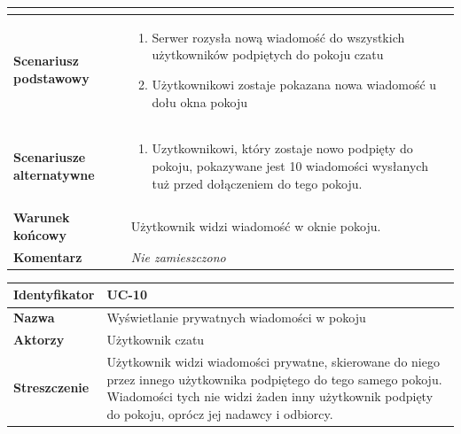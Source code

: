 \documentclass[11pt,oneside,a4paper,titlepage,onecolumn]{article}
\newenvironment{enumreq}
{ \begin{enumerate}[topsep=0pt,itemsep=-1ex,partopsep=1ex,parsep=1ex] }
{ \end{enumerate}                  }
\begin{document}
{\begin{tabular}{ | l | l | }
{		}
		\\

	\hline
		\parbox[t]{4cm}{\textbf{Scenariusz podstawowy}} & \parbox[t]{11cm}{
			\begin{enumreq}
				\item Serwer rozysła nową wiadomość do wszystkich
				użytkowników podpiętych do pokoju czatu
				\item Użytkownikowi zostaje pokazana nowa wiadomość
				u dołu okna pokoju
			\end{enumreq}
		}
		\\
		
	\hline
		\parbox[t]{4cm}{\textbf{Scenariusze alternatywne}} & \parbox[t]
		{11cm}{
			\begin{enumreq}
				\item Uzytkownikowi, który zostaje nowo podpięty do pokoju,
				pokazywane jest 10 wiadomości wysłanych tuż przed dołączeniem
				do tego pokoju.
			\end{enumreq}
		}
		\\
		
	\hline
		\parbox[t]{4cm}{\textbf{Warunek końcowy}} & \parbox[t]{11cm}{
			Użytkownik widzi wiadomość w oknie pokoju.
		}
		\\
		
	\hline
		\parbox[t]{4cm}{\textbf{Komentarz}} & \parbox[t]{11cm}{
			\textit{Nie zamieszczono}
		}
		\\

	\hline
\end{tabular}

\vspace{2em}

\begin{tabular}{ | l | l | }
	\hline
		\textbf{Identyfikator} & 
		UC-10
		\\
		
	\hline
		\textbf{Nazwa} & 
		Wyświetlanie prywatnych wiadomości w pokoju
		\\
		
	\hline
		\textbf{Aktorzy} & \parbox[t]{11cm}{
			Użytkownik czatu
		}\\
		 
	\hline
		\parbox[t]{4cm}{\textbf{Streszczenie}} & \parbox[t]{11cm}{
			Użytkownik widzi wiadomości prywatne, skierowane do niego przez
			innego użytkownika podpiętego do tego samego pokoju. Wiadomości
			tych nie widzi żaden inny użytkownik podpięty do pokoju, oprócz
			jej nadawcy i odbiorcy.
			
		}\\
		

\end{tabular}}
\end{document}
